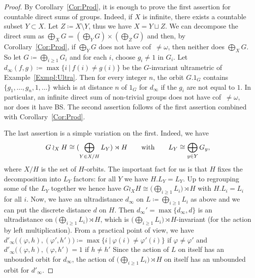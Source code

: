 \documentclass[a4paper]{article}
\newcounter{mycomment}
\newcommand{\mycomment}[2][]{\refstepcounter{mycomment}{\todo[color={green!33},size=\small]{\textbf{Commentaire [\uppercase{#1}\themycomment]:}~#2}}}
\newcommand{\PH}[1]{\todo[color={blue!33},size=small]{#1}}
\theoremstyle{definition}
\newcommand{\setst}[2]{\{#1\ |\ #2\}}
\begin{document}
\begin{proof}
By Corollary~\ref{Cor:Prod}, it is enough to prove the first assertion for countable direct sums of groups. Indeed, if $X$ is infinite, there exists a countable subset $Y \subset X$. Let $Z \coloneqq X\setminus Y$, thus we have $X = Y \sqcup Z$. We can decompose the direct sum as $\bigoplus_XG = (\bigoplus_YG) \times (\bigoplus_ZG)$
and then, by Corollary~\ref{Cor:Prod}, if $\bigoplus_YG$ does not have cof~$\neq\omega$, then neither does $\bigoplus_XG$.%
So let $G\coloneqq \bigoplus_{i\geq 1}G_i$ and for each $i$, choose $g_i\neq 1$ in $G_i$.
Let $d_\infty(f,g)\coloneqq\max\setst{i}{f(i)\neq g(i)}$ be the $G$-invariant ultrametric of Example~\ref{Exmpl:Ultra}.
Then for every integer $n$, the orbit $G.1_G$ contains $\{g_1,\dots,g_n,1,\dots\}$ which is at distance $n$ of $1_G$ for $d_\infty$ if the $g_i$ are not equal to $1$.
In particular, an infinite direct sum of non-trivial groups does not have cof~$\neq\omega$, nor does it have BS.
The second assertion follows of the first assertion combined with Corollary~\ref{Cor:Prod}.

The last assertion is a simple variation on the first.
Indeed, we have
\[
	G\wr_XH\cong(\bigoplus_{Y\in X/H}L_Y)\rtimes H\qquad\textnormal{with}\qquad L_Y\cong\bigoplus_{y\in Y}G_y,
\]
where $X/H$ is the set of $H$-orbits.
The important fact for us is that $H$ fixes the decomposition into $L_Y$ factors: for all $Y$ we have $H.L_Y=L_Y$.
Up to regrouping some of the $L_Y$ together we hence have $G\wr_XH\cong\bigl(\bigoplus_{i\geq 1}L_i\bigr)\rtimes H$ with $H.L_i=L_i$ for all $i$.
Now, we have an ultradistance $d_\infty$ on $L\coloneqq\bigoplus_{i\geq 1}L_i$ as above and we can put the discrete distance $d$ on $H$.
Then $d_\infty'=\max\{d_\infty,d\}$ is an ultradistance on $\bigl(\bigoplus_{i\geq 1}L_i\bigr)\rtimes H$, which is $\bigl(\bigoplus_{i\geq 1}L_i\bigr)\rtimes H$-invariant (for the action by left multiplication).
From a practical point of view, we have $d'_\infty\bigl((\varphi,h),(\varphi',h')\bigr)\coloneqq\max\setst{i}{\varphi(i)\neq \varphi'(i)}$ if $\varphi\neq \varphi'$ and $d'_\infty\bigl((\varphi,h),(\varphi,h')=1$ if $h\neq h'$
Since the action of $L$ on itself has an unbouded orbit for $d_\infty$, the action of $\bigl(\bigoplus_{i\geq 1}L_i\bigr)\rtimes H$ on itself has an unbounded orbit for $d'_\infty$.
\end{proof}
\end{document}
